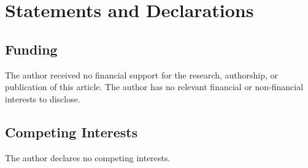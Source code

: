\documentclass[entropy,article,submit,pdftex,moreauthors]{Definitions/mdpi}
\begin{document}



\section*{Statements and Declarations}
\subsection*{Funding}  
The author received no financial support for the research, authorship, or publication of this article.
The author has no relevant financial or non-financial interests to disclose.

\subsection*{Competing Interests}  
The author declares no competing interests.
\end{document}
